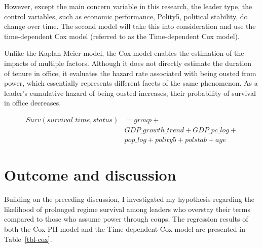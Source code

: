 \documentclass[
  12pt,
  a4paper,
  12pt]{article}
\begin{document}
However, except the main concern variable in this research, the leader
type, the control variables, such as economic performance, Polity5,
political stability, do change over time. The second model will take
this into consideration and use the time-dependent Cox model (referred
to as the Time-dependent Cox model).

Unlike the Kaplan-Meier model, the Cox model enables the estimation of
the impacts of multiple factors. Although it does not directly estimate
the duration of tenure in office, it evaluates the hazard rate
associated with being ousted from power, which essentially represents
different facets of the same phenomenon. As a leader's cumulative hazard
of being ousted increases, their probability of survival in office
decreases.

\begin{equation}
\begin{aligned}
Surv(survival\_time, status) &= group + \\
&GDP\_growth\_trend + GDP\_pc\_log + \\
&pop\_log + polity5 + polstab + age
\end{aligned}
\end{equation}

\newpage

\section{Outcome and discussion}\label{outcome-and-discussion}

Building on the preceding discussion, I investigated my hypothesis
regarding the likelihood of prolonged regime survival among leaders who
overstay their terms compared to those who assume power through coups.
The regression results of both the Cox PH model and the Time-dependent
Cox model are presented in Table~\ref{tbl-cox}.

\setlength{\LTpost}{0mm}
\end{document}
